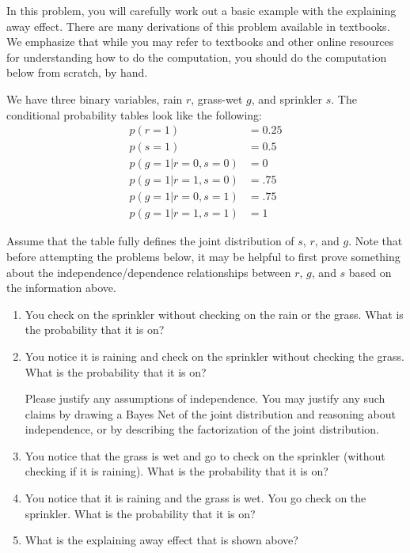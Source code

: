 \documentclass[submit]{harvardml}
\begin{document}
\begin{problem}

  In this problem, you will carefully work out a basic example with
  the explaining away effect. There are many derivations of this
  problem available in textbooks. We emphasize that while you may
  refer to textbooks and other online resources for understanding how
  to do the computation, you should do the computation below from
  scratch, by hand.

  We have three binary variables, rain $r$, grass-wet $g$, and
  sprinkler $s$.  The conditional probability tables look like the
  following:
  \begin{eqnarray*}
    p(r = 1) &= 0.25 \\
    p(s = 1) &= 0.5 \\
    p(g = 1 | r = 0 , s = 0 ) &= 0 \\
    p(g = 1 | r = 1 , s = 0 ) &= .75 \\
    p(g = 1 | r = 0 , s = 1 ) &= .75 \\
    p(g = 1 | r = 1 , s = 1 ) &= 1
  \end{eqnarray*}
  
  Assume that the table fully defines the joint distribution of $s$, $r$, and $g$. Note that before attempting the problems below, it may be helpful to first prove
  something about the independence/dependence relationships between $r$, $g$, and $s$
  based on the information above.

  \begin{enumerate}
    \item You check on the sprinkler without checking on the rain or
      the grass. What is the probability that it is on?
    \item You notice it is raining and check on the sprinkler without
      checking the grass.  What is the probability that it is on?
      
      Please justify any assumptions of independence.  You may justify any such claims by drawing a Bayes Net of the joint distribution and reasoning about independence, or by describing the factorization of the joint distribution.
    \item You notice that the grass is wet and go to check on the
      sprinkler (without checking if it is raining).  What is the
      probability that it is on?
    \item You notice that it is raining and the grass is wet.  You go
      check on the sprinkler.  What is the probability that it is on?
    \item What is the explaining away effect that is shown above?
    \end{enumerate}

\end{problem}
\end{document}
